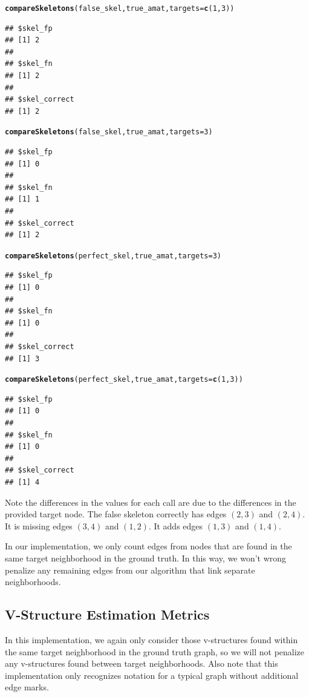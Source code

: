 \documentclass[12pt]{article}\usepackage[]{graphicx}\usepackage[]{color}
\makeatletter
\newcommand{\hlnum}[1]{\textcolor[rgb]{0.686,0.059,0.569}{#1}}%
\newcommand{\hlstd}[1]{\textcolor[rgb]{0.345,0.345,0.345}{#1}}%
\newcommand{\hlkwc}[1]{\textcolor[rgb]{0.333,0.667,0.333}{#1}}%
\newcommand{\hlkwd}[1]{\textcolor[rgb]{0.737,0.353,0.396}{\textbf{#1}}}%
\newenvironment{kframe}{%
 \def\at@end@of@kframe{}%
 \ifinner\ifhmode%
  \def\at@end@of@kframe{\end{minipage}}%
  \begin{minipage}{\columnwidth}%
 \fi\fi%
 \def\FrameCommand##1{\hskip\@totalleftmargin \hskip-\fboxsep
 \colorbox{shadecolor}{##1}\hskip-\fboxsep
     \hskip-\linewidth \hskip-\@totalleftmargin \hskip\columnwidth}%
 \MakeFramed {\advance\hsize-\width
   \@totalleftmargin\z@ \linewidth\hsize
   \@setminipage}}%
 {\par\unskip\endMakeFramed%
 \at@end@of@kframe}
\newenvironment{knitrout}{}{} %
\makeatother
\begin{document}
\begin{knitrout}
\color{fgcolor}\begin{kframe}
\begin{alltt}
\hlkwd{compareSkeletons}\hlstd{(false_skel,true_amat,}\hlkwc{targets} \hlstd{=} \hlkwd{c}\hlstd{(}\hlnum{1}\hlstd{,}\hlnum{3}\hlstd{))}
\end{alltt}
\begin{verbatim}
## $skel_fp
## [1] 2
## 
## $skel_fn
## [1] 2
## 
## $skel_correct
## [1] 2
\end{verbatim}
\begin{alltt}
\hlkwd{compareSkeletons}\hlstd{(false_skel,true_amat,}\hlkwc{targets} \hlstd{=} \hlnum{3}\hlstd{)}
\end{alltt}
\begin{verbatim}
## $skel_fp
## [1] 0
## 
## $skel_fn
## [1] 1
## 
## $skel_correct
## [1] 2
\end{verbatim}
\begin{alltt}
\hlkwd{compareSkeletons}\hlstd{(perfect_skel,true_amat,}\hlkwc{targets} \hlstd{=} \hlnum{3}\hlstd{)}
\end{alltt}
\begin{verbatim}
## $skel_fp
## [1] 0
## 
## $skel_fn
## [1] 0
## 
## $skel_correct
## [1] 3
\end{verbatim}
\begin{alltt}
\hlkwd{compareSkeletons}\hlstd{(perfect_skel,true_amat,}\hlkwc{targets} \hlstd{=} \hlkwd{c}\hlstd{(}\hlnum{1}\hlstd{,}\hlnum{3}\hlstd{))}
\end{alltt}
\begin{verbatim}
## $skel_fp
## [1] 0
## 
## $skel_fn
## [1] 0
## 
## $skel_correct
## [1] 4
\end{verbatim}
\end{kframe}
\end{knitrout}

Note the differences in the values for each call are due to the differences in the provided target node. The false skeleton correctly has edges $(2,3)$ and $(2,4)$. It is missing edges $(3,4)$ and $(1,2)$. It adds edges $(1,3)$ and $(1,4)$.

In our implementation, we only count edges from nodes that are found in the same target neighborhood in the ground truth. In this way, we won't wrong penalize any remaining edges from our algorithm that link separate neighborhoods.

\subsection*{V-Structure Estimation Metrics}
In this implementation, we again only consider those v-structures found within the same target neighborhood in the ground truth graph, so we will not penalize any v-structures found between target neighborhoods. Also note that this implementation only recognizes notation for a typical graph without additional edge marks.\\
\end{document}
